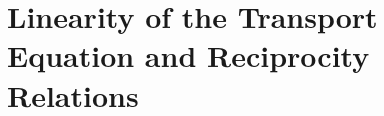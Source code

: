 \chapter[Linearity and Reciprocity]{Linearity of the Transport Equation and Reciprocity Relations}
\label{lec:linearity}